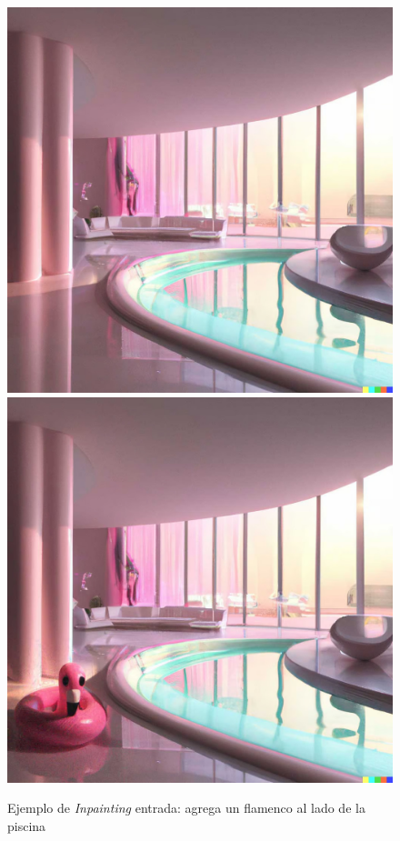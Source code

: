 \documentclass[runningheads]{llncs} %
\begin{document}
\begin{figure}
    \centering
    \includegraphics[scale=0.25]{ej3.1-dalle.jpg}
    \includegraphics[scale=0.25]{ej3.2-dalle.jpg}
    \caption{Ejemplo de \textit{Inpainting} entrada: agrega un flamenco
    al lado de la piscina \cite{ej-dalle}}
    \label{fig:dalle-ej3}
\end{figure}
\end{document}
